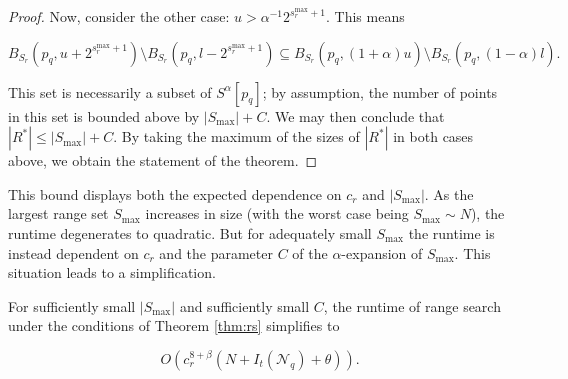 \begin{proof}
Now, consider the other case: $u > \alpha^{-1} 2^{s_r^{\max} + 1}$.
This means

\begin{equation}
B_{S_r}(p_q, u + 2^{s_r^{\max} + 1}) \setminus B_{S_r}(p_q, l - 2^{s_r^{\max} +
1}) \subseteq B_{S_r}(p_q, (1 + \alpha) u) \setminus B_{S_r}(p_q, (1 - \alpha)
l).
\end{equation}

This set is necessarily a subset of $S^{\alpha}[p_q]$; by
assumption, the number of points in this set is bounded above by $|S_{\max}| +
C$.  We may then conclude that $|R^*| \le |S_{\max}| + C$.  By taking the
maximum of the sizes of $|R^*|$ in both cases above, we obtain the statement of
the theorem.
\end{proof}

This bound displays both the expected dependence on $c_r$ and $|S_{\max}|$.  As
the largest range set $S_{\max}$ increases in size (with the worst case being
$S_{\max} \sim N$), the runtime degenerates to quadratic.  But for adequately
small $S_{\max}$ the runtime is instead dependent on $c_r$ and the parameter $C$
of the $\alpha$-expansion of $S_{\max}$.  This situation leads to a
simplification.

\begin{cor}
For sufficiently small $|S_{\max}|$ and sufficiently small $C$, the runtime of
range search under the conditions of Theorem \ref{thm:rs} simplifies to

\begin{equation}
O(c_r^{8 + \beta} (N + I_t(\mathscr{N}_q) + \theta)).
\end{equation}
\label{cor:rs}
\end{cor}

%



